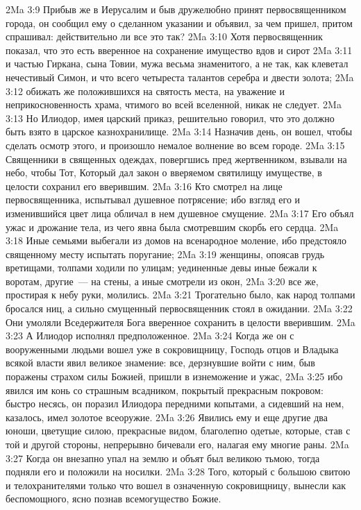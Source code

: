 \vs 2Ma 3:9 Прибыв же в Иерусалим и быв дружелюбно принят первосвященником города, он сообщил ему о сделанном указании и объявил, за чем пришел, притом спрашивал: действительно ли все это так?
\vs 2Ma 3:10 Хотя первосвященник показал, что это есть вверенное на сохранение имущество вдов и сирот
\vs 2Ma 3:11 и частью Гиркана, сына Товии, мужа весьма знаменитого, а не так, как клеветал нечестивый Симон, и что всего четыреста талантов серебра и двести золота;
\vs 2Ma 3:12 обижать же положившихся на святость места, на уважение и неприкосновенность храма, чтимого во всей вселенной, никак не следует.
\vs 2Ma 3:13 Но Илиодор, имея царский приказ, решительно говорил, что это должно быть взято в царское казнохранилище.
\rsbpar\vs 2Ma 3:14 Назначив день, он вошел, чтобы сделать осмотр этого, и произошло немалое волнение во всем городе.
\vs 2Ma 3:15 Священники в священных одеждах, повергшись пред жертвенником, взывали на небо, чтобы Тот, Который дал закон о вверяемом святилищу имуществе, в целости сохранил его вверившим.
\vs 2Ma 3:16 Кто смотрел на лице первосвященника, испытывал душевное потрясение; ибо взгляд его и изменившийся цвет лица обличал в нем душевное смущение.
\vs 2Ma 3:17 Его объял ужас и дрожание тела, из чего явна была смотревшим скорбь его сердца.
\vs 2Ma 3:18 Иные семьями выбегали из домов на всенародное моление, ибо предстояло священному месту испытать поругание;
\vs 2Ma 3:19 женщины, опоясав грудь вретищами, толпами ходили по улицам; уединенные девы иные бежали к воротам, другие~--- на стены, а иные смотрели из окон,
\vs 2Ma 3:20 все же, простирая к небу руки, молились.
\vs 2Ma 3:21 Трогательно было, как народ толпами бросался ниц, а сильно смущенный первосвященник стоял в ожидании.
\vs 2Ma 3:22 Они умоляли Вседержителя Бога вверенное сохранить в целости вверившим.
\vs 2Ma 3:23 А Илиодор исполнял предположенное.
\vs 2Ma 3:24 Когда же он с вооруженными людьми вошел уже в сокровищницу, Господь отцов и Владыка всякой власти явил великое знамение: все, дерзнувшие войти с ним, быв поражены страхом силы Божией, пришли в изнеможение и ужас,
\vs 2Ma 3:25 ибо явился им конь со страшным всадником, покрытый прекрасным покровом: быстро несясь, он поразил Илиодора передними копытами, а сидевший на нем, казалось, имел золотое всеоружие.
\vs 2Ma 3:26 Явились ему и еще другие два юноши, цветущие силою, прекрасные видом, благолепно одетые, которые, став с той и другой стороны, непрерывно бичевали его, налагая ему многие раны.
\vs 2Ma 3:27 Когда он внезапно упал на землю и объят был великою тьмою, тогда подняли его и положили на носилки.
\vs 2Ma 3:28 Того, который с большою свитою и телохранителями только что вошел в означенную сокровищницу, вынесли как беспомощного, ясно познав всемогущество Божие.
